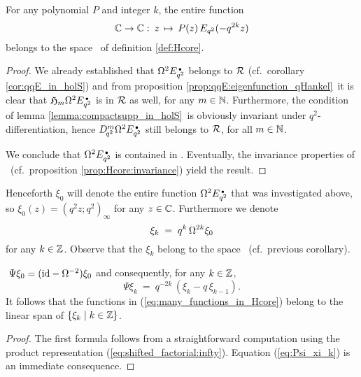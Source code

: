 \begin{cor} \label{cor:qExp_in_Hcore}
For any polynomial\/ $P$ and integer\/ $k$, the entire function
\begin{equation}\label{eq:many_functions_in_Hcore}
  \mathbb{C} \rightarrow \mathbb{C} : \: z \,\mapsto \, P(z)\, E_{q^2}(-q^{2k} z)
\end{equation}
belongs to the space\/ \Hcore\ of definition \ref{def:Hcore}.
\end{cor}


\begin{proof}
We already established that $\Omega^2 E_{q^2}^{\scriptscriptstyle \, \bullet}$ belongs to $\mathcal R$
(cf.\ corollary \ref{cor:qqE_in_holS}) and from
proposition \ref{prop:qqE:eigenfunction_qHankel}\
it is clear that $\mathfrak{H}_{m} \Omega^2 E_{q^2}^{\scriptscriptstyle \, \bullet}$ is in $\mathcal R$ as well,
for any $m\in \mathbb{N}$. Furthermore, the condition of lemma
\ref{lemma:compactsupp_in_holS}\ is obviously invariant under $q^2$-differentiation,
hence $D_{\!q^2}^m \Omega^2 E_{q^2}^{\scriptscriptstyle \, \bullet}$ still belongs to $\mathcal R$, for all $m\in \mathbb{N}$.

We conclude that $\Omega^2 E_{q^2}^{\scriptscriptstyle \, \bullet}$ is contained in \Hcore\@.
Eventually, the invariance properties of \Hcore\
(cf.\ proposition \ref{prop:Hcore:invariance}) yield the result.
\end{proof}


\begin{notation} \label{not:xi_k} \rm
Henceforth $\xi_0$ will denote the entire function $\Omega^2 E_{q^2}^{\scriptscriptstyle \, \bullet}$ that was investigated above,
so $\xi_0(z) = (q^2 z; q^2)_\infty$ for any $z \in \mathbb{C}$.
Furthermore we denote
\begin{equation}\label{eq:not:xi_k}
   \xi_k   \;=\; q^k \, \Omega^{2k} \xi_0
\end{equation}
for any $k\in \mathbb{Z}$.
Observe that the $\xi_k$ belong to the space \Hcore\ (cf.\ previous corollary).
\end{notation}



\begin{lemma} \label{lemma:Psi_xi}
$\;\Psi \xi_0 = (\mbox{\rm id} - \Omega^{-2})\xi_0$ and consequently, for any\/ $k\in \mathbb{Z}$,
\begin{equation}\label{eq:Psi_xi_k}
  \Psi \xi_k \:=\: q^{-2k} \,(\xi_k - q \,\xi_{k-1}).
\end{equation}
\rm It follows that the functions in (\ref{eq:many_functions_in_Hcore})
belong to the linear span of\/ $\{ \xi_k \mid k\in \mathbb{Z}  \}$.
\end{lemma}

\begin{proof}
The first formula follows from a straightforward computation using
the product representation (\ref{eq:shifted_factorial:infty}).
Equation (\ref{eq:Psi_xi_k}) is an immediate consequence.
\end{proof}


